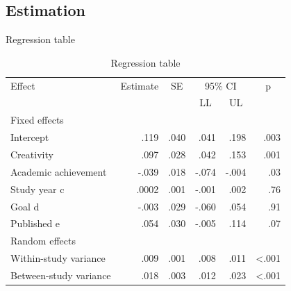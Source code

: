 \documentclass[xcolor=table]{beamer}
\begin{document}
\subsection{Estimation}
\begin{frame}{Regression table}
    
    \begin{table}[]
        \small
        \caption{Regression table}
        \label{tab:my-table}
        \begin{tabular}{lrrrrr}
        \hline
        Effect        & \multicolumn{1}{c}{Estimate} & \multicolumn{1}{c}{SE} & \multicolumn{2}{c}{95\% CI}                     & \multicolumn{1}{c}{p} \\ \cline{4-5}
                      & \multicolumn{1}{l}{}         & \multicolumn{1}{l}{}   & \multicolumn{1}{c}{LL} & \multicolumn{1}{c}{UL} & \multicolumn{1}{l}{}  \\ \hline
        Fixed effects & \multicolumn{1}{l}{}         & \multicolumn{1}{l}{}   & \multicolumn{1}{l}{}   & \multicolumn{1}{l}{}   & \multicolumn{1}{l}{}  \\
        \hspace{3mm}Intercept                          & .119  & .040 & .041  & .198  & .003            \\
        \hspace{3mm}Creativity            & .097  & .028 & .042  & .153  & .001            \\
        \hspace{3mm}Academic achievement  & -.039 & .018 & -.074 & -.004 & .03             \\
        \hspace{3mm}Study year c                       & .0002 & .001 & -.001 & .002  & .76             \\
        \hspace{3mm}Goal d                             & -.003 & .029 & -.060 & .054  & .91             \\
        \hspace{3mm}Published e                        & .054  & .030 & -.005 & .114  & .07             \\
        Random effects                     &       &      &       &       &                 \\
        \hspace{3mm}Within-study variance              & .009  & .001 & .008  & .011  & \textless{}.001 \\
        \hspace{3mm}Between-study variance             & .018  & .003 & .012  & .023  & \textless{}.001 \\ \hline
        \end{tabular}
        \end{table}

\end{frame}
\end{document}

